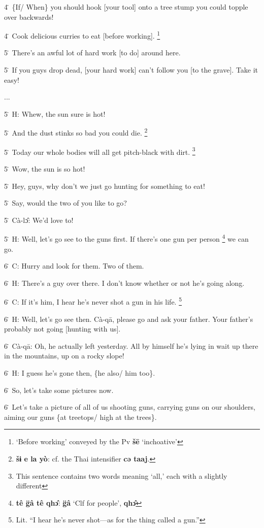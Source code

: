 {4\. \{If/ When\} you should hook [your tool] onto a tree stump you could topple
over backwards!

4\. Cook delicious curries to eat [before working]. \footnote{`Before working' conveyed by the Pv \textbf{šē }`inchoative'}

5\. There's an awful lot of hard work [to do] around here.

5\. If you guys drop dead, [your hard work] can't follow you [to the grave]. Take
it easy!

...

5\. H: Whew, the sun sure is hot!

5\. And the dust stinks so bad you could die. \footnote{\textbf{šɨ e la yò}: cf. the Thai intensifier \textbf{cə taaj}.}

5\. Today our whole bodies will all get pitch-black with dirt. \footnote{This sentence contains two words meaning `all,' each with a slightly different}

5\. Wow, the sun is so hot!

5\. Hey, guys, why don't we just go hunting for something to eat!

5\. Say, would the two of you like to go?

5\. Cà-lɔ̂: We'd love to!

5\. H: Well, let's go see to the guns first. If there's one gun per person \footnote{\textbf{tê g̈â tê qhɔ̂}:\textbf{ g̈â} `Clf for people', \textbf{qhɔ̂}}
we can go.

6\. C: Hurry and look for them. Two of them.

6\. H: There's a guy over there. I don't know whether or not he's going along.

6\. C: If it's him, I hear he's never shot a gun in his life. \footnote{Lit. ``I hear he's never shot---as for the thing called a gun.''}

6\. H: Well, let's go see then. Cà-qā, please go and ask your father. Your father's
probably not going [hunting with us].

6\. Cà-qā: Oh, he actually left yesterday. All by himself he's lying in wait
up there in the mountains, up on a rocky slope!

6\. H: I guess he's gone then, \{he also/ him too\}.

6\. So, let's take some pictures now.

6\. Let's take a picture of all of us shooting guns, carrying guns on our shoulders,
aiming our guns \{at treetops/ high at the trees\}.

}
